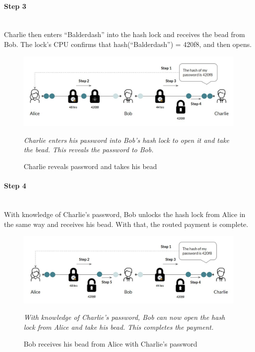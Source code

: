\documentclass[a4paper, 12pt]{report}
\begin{document}
\paragraph{Step 3} \hspace{0pt} \\
Charlie then enters “Balderdash” into the hash lock and receives the bead from Bob. The lock’s CPU confirms that hash(“Balderdash”) = 420f8, and then opens.

\begin{figure}[H]
	\includegraphics[width=\textwidth]{13_HTLC_Step3}
	\caption{Charlie reveals password and takes his bead}
	\medskip
	\small \textit{Charlie enters his password into Bob's hash lock to open it and take the bead. This reveals the password to Bob.}
	\label{fig:13_HTLC_Step3}
\end{figure} 

\paragraph{Step 4} \hspace{0pt} \\
With knowledge of Charlie’s password, Bob unlocks the hash lock from Alice in the same way and receives his bead. With that, the routed payment is complete.

\begin{figure}[H]
	\includegraphics[width=\textwidth]{14_HTLC_Step4}
	\caption{Bob receives his bead from Alice with Charlie's password}
	\medskip
	\small \textit{With knowledge of Charlie's password, Bob can now open the hash lock from Alice and take his bead. This completes the payment.}
	\label{fig:14_HTLC_Step4}
\end{figure} 
\end{document}
